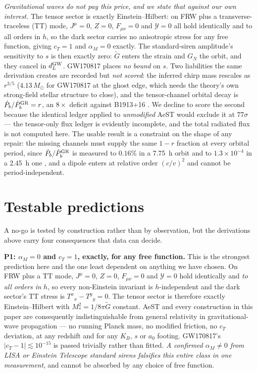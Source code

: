 \documentclass[aps,prd,twocolumn,10pt,nofootinbib,superscriptaddress]{revtex4-2}
\newcommand{\YY}{\mathcal{Y}}
\newcommand{\Gt}{\tilde{G}}
\newcommand{\Msun}{M_\odot}
\begin{document}
\emph{Gravitational waves do not pay this price, and we state that against our own interest.} The
tensor sector is exactly Einstein--Hilbert: on FRW plus a transverse-traceless (TT) mode,
$J^\mu=0$, $Z=0$, $F_{\mu\nu}=0$ and $\YY=0$ all hold identically and to all orders in $h$, so the
dark sector carries no anisotropic stress for any free function, giving $c_T=1$ and $\alpha_M=0$
exactly. The standard-siren amplitude's sensitivity to $s$ is then exactly zero: $\Gt$ enters the
strain and $G_N$ the orbit, and they cancel in $d_L^{\rm GW}$. GW170817 \cite{GW170817} places
\emph{no bound} on $s$. Two liabilities the same derivation creates are recorded but \emph{not
scored}: the inferred chirp mass rescales as $r^{3/5}$ ($4.13\,\Msun$ for GW170817 at the ghost
edge, which needs the theory's own strong-field stellar structure to close), and the tensor-channel
orbital decay is $\dot P_b/\dot P_b^{\rm GR}=r$, an $8\times$ deficit against B1913+16
\cite{WeisbergHuang}. We decline to score the second because the identical ledger applied to
\emph{unmodified} AeST would exclude it at $77\sigma$ --- the tensor-only flux ledger is evidently
incomplete, and the total radiated flux is not computed here. The usable result is a constraint on
the shape of any repair: the missing channels must supply the same $1-r$ fraction at every orbital
period, since $\dot P_b/\dot P_b^{\rm GR}$ is measured to $0.16\%$ in a 7.75~h orbit and to
$1.3\times10^{-4}$ in a 2.45~h one \cite{Kramer2021}, and a dipole enters at relative order
$(c/v)^2$ and cannot be period-independent.

\section{Testable predictions}

A no-go is tested by construction rather than by observation, but the derivations above carry four
consequences that data can decide.

\textbf{P1: $\alpha_M=0$ and $c_T=1$, exactly, for any free function.} This is the strongest
prediction here and the one least dependent on anything we have chosen. On FRW plus a TT mode,
$J^\mu=0$, $Z=0$, $F_{\mu\nu}=0$ and $\YY=0$ hold identically and \emph{to all orders in} $h$, so
every non-Einstein invariant is $h$-independent and the dark sector's TT stress is
$T^x{}_x-T^y{}_y=0$. The tensor sector is therefore exactly Einstein--Hilbert with
$M_*^2=1/8\pi\Gt$ constant. AeST and every construction in this paper are consequently
indistinguishable from general relativity in gravitational-wave propagation --- no running Planck
mass, no modified friction, no $c_T$ deviation, at any redshift and for any $K_B$, $s$ or $a_0$
footing. GW170817's $|c_T-1|\lesssim10^{-15}$ is passed trivially rather than fitted. \emph{A
confirmed $\alpha_M\neq0$ from LISA or Einstein Telescope standard sirens falsifies this entire
class in one measurement}, and cannot be absorbed by any choice of free function.
\end{document}
